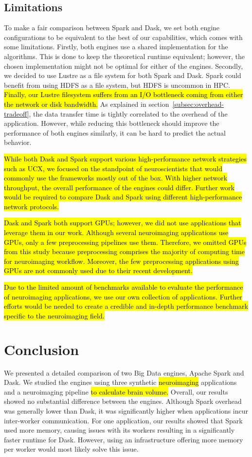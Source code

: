 \documentclass[AMA,STIX1COL]{WileyNJD-v2}
\newcommand{\HL}[1]{\hl{#1}}
\begin{document}
\subsection{Limitations}
To make a fair comparison between Spark and Dask, we set both engine configurations
to be equivalent to the best of our capabilities, which comes with some limitations.
Firstly, both engines use a shared implementation for the algorithms.
This is done to keep the theoretical runtime equivalent; however, the chosen
implementation might not be optimal for either of the engines.
Secondly, we decided to use Lustre as a file system for both Spark and Dask.
Spark could benefit from using HDFS as a file system, but HDFS is uncommon in HPC.
\HL{Finally, our Lustre filesystem suffers from an I/O bottleneck coming from 
either the network or disk bandwidth.}
As explained in section~{\ref{subsec:overhead-tradeoff}}, the data transfer 
time is tightly correlated to the overhead of the application.
However, while reducing this bottleneck should improve the performance of 
both engines similarly, it can be hard to predict the actual behavior.

\HL{
	While both Dask and Spark support various high-performance network strategies
	such as UCX, we focused on the standpoint of neuroscientists that would 
	commonly use the frameworks mostly out of the box.
	With higher network throughput, the overall performance of the engines could differ.
	Further work would be required to compare Dask and Spark using different high-performance
	network protocols.
}
			
\HL{
	Dask and Spark both support GPUs; however, we did not use applications that
	leverage them in our work.
	Although several neuroimaging applications use GPUs, only a few preprocessing pipelines use them.
	Therefore, we omitted GPUs from this study because preprocessing comprises the majority of computing time for neuroimaging
	workflow.
	Moreover, the few preprocessing applications using GPUs are not commonly used
	due to their recent development.
}

\HL{
	Due to the limited amount of benchmarks available to evaluate the performance
    of neuroimaging applications, we use our own collection of applications.
    Further efforts would be needed to create a credible and in-depth performance
    benchmark specific to the neuroimaging field.
}
											
\section{Conclusion}
We presented a detailed comparison of two Big Data engines, Apache Spark and Dask.
We studied the engines using three synthetic \HL{neuroimaging} applications and 
a neuroimaging pipeline \HL{to calculate brain volume.}
Overall, our results showed no substantial difference between the engines.
Although Spark overhead was generally lower than Dask, it was significantly higher when applications incur inter-worker communication.
For one application, our results showed that Spark used more memory, causing issues with its workers resulting in a significantly faster runtime for Dask.
However, using an infrastructure offering more memory per worker would most likely solve this issue.
																					
\end{document}
